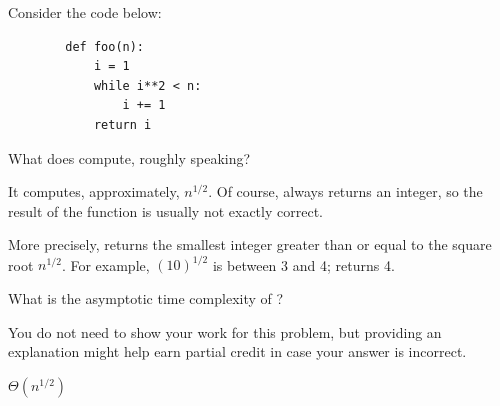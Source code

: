 \begin{prob}
    Consider the code below:

    \begin{verbatim}
        def foo(n):
            i = 1
            while i**2 < n:
                i += 1
            return i
    \end{verbatim}

    \begin{subprobset}
        \begin{subprob}
            What does  compute, roughly speaking?

            \begin{soln}
                It computes, approximately, $n^{1/2}$. Of course, 
                always returns an integer, so the result of the function is usually
                not exactly correct.

                More precisely,  returns the smallest integer greater
                than or equal to the square root $n^{1/2}$. For example, $(10)^{1/2}$ is between 3 and 4;
                 returns 4.
            \end{soln}
        \end{subprob}

        \begin{subprob}
            What is the asymptotic time complexity of ?

            You do not need to show your work for this problem, but providing
            an explanation might help earn partial credit in case your answer
            is incorrect.

            \begin{soln}
                $\Theta(n^{1/2})$
            \end{soln}
        \end{subprob}
    \end{subprobset}

\end{prob}
